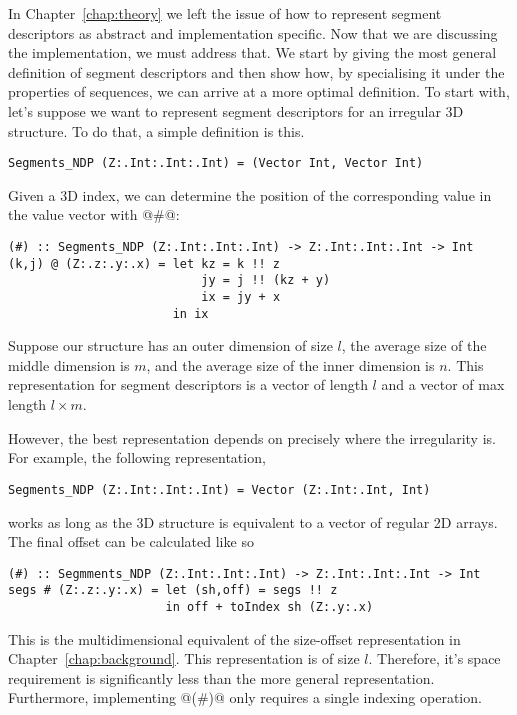 In Chapter~\ref{chap:theory} we left the issue of how to represent segment descriptors as abstract and implementation specific. Now that we are discussing the implementation, we must address that. We start by giving the most general definition of segment descriptors and then show how, by specialising it under the properties of sequences, we can arrive at a more optimal definition. To start with, let's suppose we want to represent segment descriptors for an irregular 3D structure. To do that, a simple definition is this.
%
\begin{lstlisting}[style=ndp]
Segments_NDP (Z:.Int:.Int:.Int) = (Vector Int, Vector Int)
\end{lstlisting}
%
Given a 3D index, we can determine the position of the corresponding value in the value vector with @#@:
%
\begin{lstlisting}[style=ndp]
(#) :: Segments_NDP (Z:.Int:.Int:.Int) -> Z:.Int:.Int:.Int -> Int
(k,j) @ (Z:.z:.y:.x) = let kz = k !! z
                           jy = j !! (kz + y)
                           ix = jy + x
                       in ix
\end{lstlisting}
%

Suppose our structure has an outer dimension of size $l$, the average size of the middle dimension is $m$, and the average size of the inner dimension is $n$. This representation for segment descriptors is a vector of length $l$ and a vector of max length $l \times m$.

However, the best representation depends on precisely where the irregularity is. For example, the following representation,
%
\begin{lstlisting}[style=ndp]
Segments_NDP (Z:.Int:.Int:.Int) = Vector (Z:.Int:.Int, Int)
\end{lstlisting}
%
works as long as the 3D structure is equivalent to a vector of regular 2D arrays. The final offset can be calculated like so
%
\begin{lstlisting}[style=ndp]
(#) :: Segmments_NDP (Z:.Int:.Int:.Int) -> Z:.Int:.Int:.Int -> Int
segs # (Z:.z:.y:.x) = let (sh,off) = segs !! z
                      in off + toIndex sh (Z:.y:.x)
\end{lstlisting}
%
This is the multidimensional equivalent of the size-offset representation in Chapter~\ref{chap:background}. This representation is of size $l$. Therefore, it's space requirement is significantly less than the more general representation. Furthermore, implementing @(#)@ only requires a single indexing operation.

